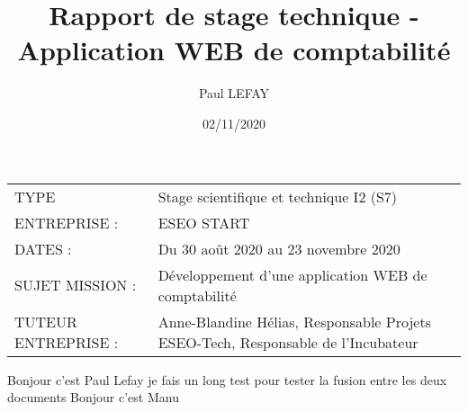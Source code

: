 \documentclass[twoside]{article}
\title{Rapport de stage technique - Application WEB de comptabilité}
\author{Paul LEFAY}
\date{02/11/2020}
\begin{document}
\cfoot{\thepage}

\maketitle{}										%

\begin{center}
	\begin{tabular}{ m{8cm} m{8cm} }
	TYPE & \mbox{\ooalign{$\checkmark$\cr\hidewidth$\square$\hidewidth\cr}}  Stage scientifique et technique I2 (S7) \\
   ENTREPRISE :  & ESEO START \\
   DATES : & Du 30 août 2020 au 23 novembre 2020 \\
   SUJET MISSION : & Développement d'une application WEB de comptabilité \\
   TUTEUR ENTREPRISE :  & Anne-Blandine Hélias, Responsable Projets ESEO-Tech, Responsable de l'Incubateur
 \end{tabular}
\end{center}

\newpage
Bonjour c'est Paul Lefay je fais un long test pour tester la fusion entre les deux documents 
Bonjour c'est Manu 
\end{document}
